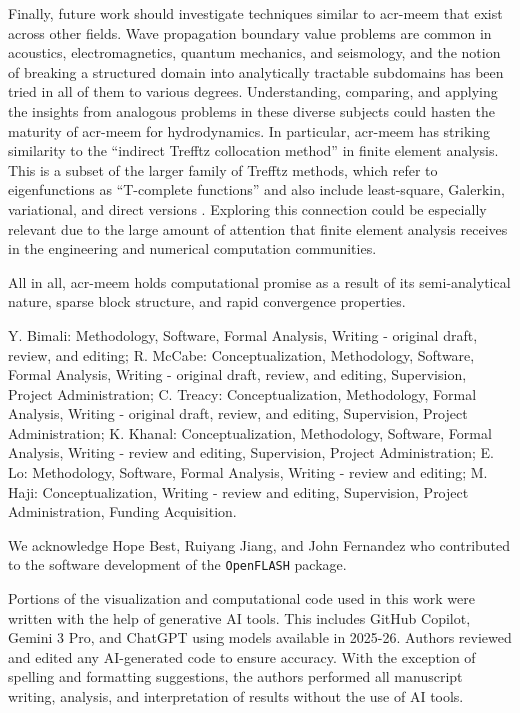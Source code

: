 \documentclass[ASNA,twocolumn]{USG} %
\begin{document}
Finally, future work should investigate techniques similar to \gls{acr-meem} that exist across other fields.
Wave propagation boundary value problems are common in acoustics, electromagnetics, quantum mechanics, and seismology, 
and the notion of breaking a structured domain into analytically tractable subdomains has been tried in all of them to various degrees.
Understanding, comparing, and applying the insights from analogous problems in these diverse subjects could hasten the maturity of \gls{acr-meem} for hydrodynamics.
In particular, \gls{acr-meem} has striking similarity to the ``indirect Trefftz collocation method'' in finite element analysis.
This is a subset of the larger family of Trefftz methods, which refer to eigenfunctions as ``T-complete functions'' and also include least-square, Galerkin, variational, and direct versions \citep{kita_trefftz_1995}.
Exploring this connection could be especially relevant due to the large amount of attention that finite element analysis receives in the engineering and numerical computation communities.

All in all, \gls{acr-meem} holds computational promise as a result of its semi-analytical nature, sparse block structure, and rapid convergence properties.


{}

  Y. Bimali: Methodology, Software, Formal Analysis, Writing - original draft, review, and editing;
  R. McCabe: Conceptualization, Methodology, Software, Formal Analysis, Writing - original draft, review, and editing, Supervision, Project Administration;
  C. Treacy: Conceptualization, Methodology, Formal Analysis, Writing - original draft, review, and editing, Supervision, Project Administration;
  K. Khanal: Conceptualization, Methodology, Software, Formal Analysis, Writing - review and editing, Supervision, Project Administration;
  E. Lo: Methodology, Software, Formal Analysis, Writing - review and editing;
  M. Haji: Conceptualization, Writing - review and editing, Supervision, Project Administration, Funding Acquisition.


  We acknowledge Hope Best, Ruiyang Jiang, and John Fernandez who contributed to the software development of the \texttt{OpenFLASH} package.

  Portions of the visualization and computational code used in this work were written with the help of generative AI tools.
  This includes GitHub Copilot, Gemini 3 Pro, and ChatGPT using models available in 2025-26.
  Authors reviewed and edited any AI-generated code to ensure accuracy.
  With the exception of spelling and formatting suggestions, the authors performed all manuscript writing, analysis, and interpretation of results without the use of AI tools.
\end{document}
